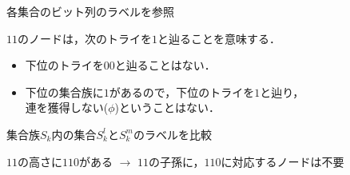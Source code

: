 \documentclass[12pt,dvipdfmx,mathserif,uplatex,aspectratio=32]{beamer}
\begin{document}
\begin{frame}{各集合のビット列のラベルを参照}

 {\centering

  \scalebox{0.8}{}

 }

\vspace{5mm}
{\centering
$11$のノードは，次のトライを$1$と辿ることを意味する．
}

{\centering

\begin{itemize}
 \item 下位のトライを$00$と辿ることはない．
 \item 下位の集合族に$1$があるので，下位のトライを$1$と辿り，\\ \vspace{1mm} 連を獲得しない($\phi$)ということはない．
\end{itemize}

}
\end{frame}

\begin{frame}{集合族$S_{k}$内の集合$S_{k}^{l}$と$S_{k}^{m}$のラベルを比較}

 {\centering

  \scalebox{0.8}{}

 }

\vspace{3mm}

{\centering
$11$の高さに$110$がある $\rightarrow$ $11$の子孫に，$110$に対応するノードは不要 \\
\vspace{3mm}
}


\end{frame}






\end{document}
